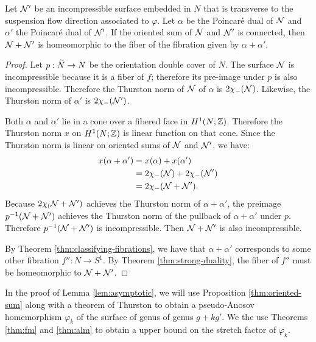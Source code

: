 \begin{prop}
  \label{thm:oriented-sum}
  Let $\mathcal{N}'$ be an incompressible surface embedded in $N$ that is transverse to the suspension flow direction associated to $\varphi$.
  Let $\alpha$ be the Poincar\'e dual of $\mathcal{N}$ and $\alpha'$ the Poincar\'e dual of $\mathcal{N}'$.
  If the oriented sum of $\mathcal{N}$ and $\mathcal{N}'$ is connected, then $\mathcal{N} + \mathcal{N}'$ is homeomorphic to the fiber of the fibration given by $\alpha + \alpha'$.
\end{prop}
\begin{proof}
  Let $p:\widetilde{N}\rightarrow N$ be the orientation double cover of $N$.
  The surface $\mathcal{N}$ is incompressible because it is a fiber of $f$; therefore its pre-image under $p$ is also incompressible.  Therefore the Thurston norm of $\mathcal{N}$ of $\alpha$ is $2\chi_-(\mathcal{N})$.  Likewise, the Thurston norm of $\alpha'$ is $2\chi_-(\mathcal{N}')$.

 Both $\alpha$ and $\alpha'$ lie in a cone over a fibered face in $H^1(N;\mathbb{Z})$.  Therefore the Thurston norm $x$ on $H^1(N;\mathbb{Z})$ is linear function on that cone.
 Since the Thurston norm is linear on oriented sums of $\mathcal{N}$ and $\mathcal{N}'$, we have:
  \begin{align*}
    x(\alpha + \alpha') &= x(\alpha) + x(\alpha') \\
                        &= 2\chi_-(\mathcal{N}) + 2\chi_-(\mathcal{N}') \\
                        &= 2\chi_-(\mathcal{N} + \mathcal{N}').
  \end{align*}
  Because $2\chi_(\mathcal{N}+\mathcal{N}')$ achieves the Thurston norm of $\alpha+\alpha'$, the preimage $p^{-1}(\mathcal{N}+\mathcal{N}')$ achieves the Thurston norm of the pullback of $\alpha+\alpha'$ under $p$.  Therefore $p^{-1}(\mathcal{N}+\mathcal{N}')$ is incompressible.  Then $\mathcal{N}+\mathcal{N}'$ is also incompressible.

  By Theorem \ref{thm:classifying-fibrations}, we have that $\alpha + \alpha'$ corresponds to some other fibration $f'':N\rightarrow S^1$.
  By Theorem \ref{thm:strong-duality}, the fiber of $f''$ must be homeomorphic to $\mathcal{N} + \mathcal{N}'$.  %
\end{proof}

In the proof of Lemma \ref{lem:asymptotic}, we will use Proposition \ref{thm:oriented-sum} along with a theorem of Thurston to obtain a pseudo-Anosov homemorphism $\varphi_k$ of the surface of genus of genus $g+kg'$.  We the use Theorems \ref{thm:fm} and \ref{thm:alm} to obtain a upper bound on the stretch factor of $\varphi_k$.

